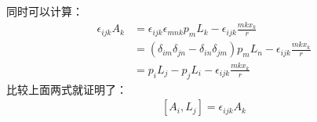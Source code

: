 \documentclass[a4paper]{ctexart}
\begin{document}
    同时可以计算：
    \begin{align}
        \epsilon_{ijk}A_{k} &= \epsilon_{ijk}\epsilon_{mnk}p_{m}L_{k} - \epsilon_{ijk}\frac{mkx_{k}}{r}\\
        &=\left(\delta_{im}\delta_{jn}- \delta_{in}\delta_{jm}\right)p_{m}L_{n} - \epsilon_{ijk}\frac{mkx_{k}}{r}\\
        &= p_{i}L_{j} - p_{j}L_{i} - \epsilon_{ijk}\frac{mkx_{k}}{r}
    \end{align}
    比较上面两式就证明了：
    \begin{align}
        \left[A_{i}, L_{j}\right] = \epsilon_{ijk}A_{k}
    \end{align}
\end{document}
